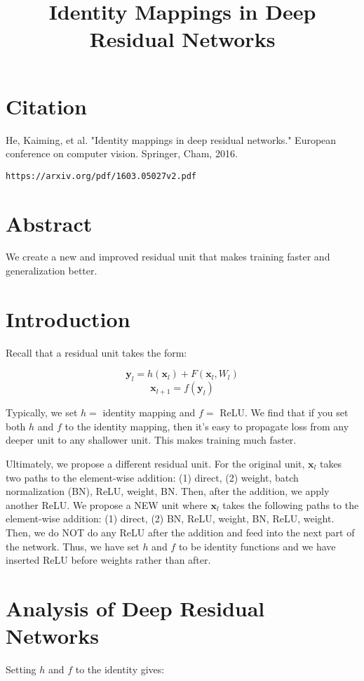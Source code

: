 \documentclass[a4paper]{article}
\title{Identity Mappings in Deep Residual Networks}
\date{}
\begin{document}
\maketitle

\section{Citation}
He, Kaiming, et al. "Identity mappings in deep residual networks." European conference on computer vision. Springer, Cham, 2016.

\begin{verbatim}
https://arxiv.org/pdf/1603.05027v2.pdf
\end{verbatim}

\section{Abstract}
We create a new and improved residual unit that makes training faster and
generalization better.

\section{Introduction}
Recall that a residual unit takes the form:

$$
\mathbf{y}_l = h(\mathbf{x}_l) + F(\mathbf{x}_l, W_l)
$$
$$
\mathbf{x}_{l+1} = f(\mathbf{y}_l)
$$

Typically, we set $h = $ identity mapping and $f = $ ReLU. We find that if
you set both $h$ and $f$ to the identity mapping, then it's easy to propagate
loss from any deeper unit to any shallower unit. This makes training much
faster.

Ultimately, we propose a different residual unit. For the original unit,
$\mathbf{x}_l$ takes two paths to the element-wise addition: (1) direct,
(2) weight, batch normalization (BN), ReLU, weight, BN. Then, after the
addition, we apply another ReLU. We propose a NEW unit where $\mathbf{x}_{l}$
takes the following paths to the element-wise addition: (1) direct, (2) BN,
ReLU, weight, BN, ReLU, weight. Then, we do NOT do any ReLU after the addition
and feed into the next part of the network. Thus, we have set $h$ and $f$ to
be identity functions and we have inserted ReLU before weights rather than
after.

\section{Analysis of Deep Residual Networks}
Setting $h$ and $f$ to the identity gives:
\end{document}
